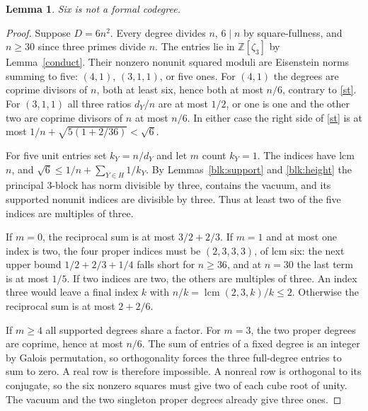 \documentclass[11pt]{amsart}
\numberwithin{equation}{section}
\newtheorem{lemma}[theorem]{Lemma}
\DeclareMathOperator{\lcm}{lcm}
\newcommand{\ZZ}{\mathbb Z}
\begin{document}
\begin{lemma}\label{six}
Six is not a formal codegree.
\end{lemma}
\begin{proof}
Suppose $D=6n^2$. Every degree divides $n$, $6\mid n$ by square-fullness,
and $n\ge30$ since three primes divide $n$. The entries lie in
$\ZZ[\zeta_3]$ by Lemma~\ref{conduct}. Their nonzero nonunit squared
moduli are Eisenstein norms summing to five: $(4,1)$, $(3,1,1)$, or five
ones. For $(4,1)$ the degrees are coprime divisors of $n$, both at least
six, hence both at most $n/6$, contrary to \eqref{st}. For $(3,1,1)$
all three ratios $d_Y/n$ are at most $1/2$, or one is one and the other
two are coprime divisors of $n$ at most $n/6$. In either case the
right side of \eqref{st} is at most $1/n+\sqrt{5(1+2/36)}<\sqrt6$.

For five unit entries set $k_Y=n/d_Y$ and let $m$ count $k_Y=1$.
The indices have lcm $n$, and
$\sqrt6\le1/n+\sum_{Y\in H}1/k_Y$. By Lemmas~\ref{blk:support}
and \ref{blk:height} the principal $3$-block has norm divisible by three,
contains the vacuum, and its supported nonunit indices are divisible
by three. Thus at least two of the five indices are multiples of three.

If $m=0$, the reciprocal sum is at most $3/2+2/3$. If $m=1$ and
at most one index is two, the four proper indices must be $(2,3,3,3)$,
of lcm six: the next upper bound $1/2+2/3+1/4$ falls short for $n\ge36$,
and at $n=30$ the last term is at most $1/5$. If two indices are two,
the others are multiples of three. An index three would leave a final
index $k$ with $n/k=\lcm(2,3,k)/k\le2$. Otherwise the reciprocal sum
is at most $2+2/6$.

If $m\ge4$ all supported degrees share a factor. For $m=3$, the two
proper degrees are coprime, hence at most $n/6$. The sum of entries of
a fixed degree is an integer by Galois permutation, so orthogonality
forces the three full-degree entries to sum to zero. A real row is
therefore impossible. A nonreal row is orthogonal to its conjugate,
so the six nonzero squares must give two of each cube root of unity.
The vacuum and the two singleton proper degrees already give three ones.


\end{proof}
\end{document}
